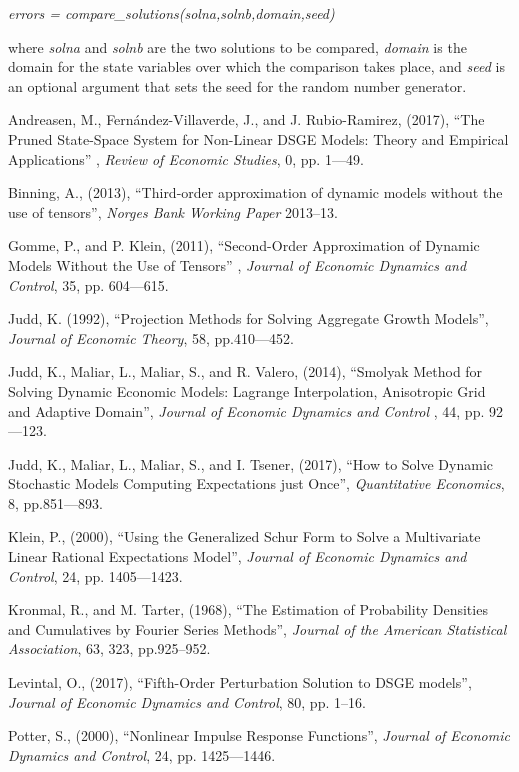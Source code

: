 \documentclass[notitlepage,11pt]{article}
\begin{document}
\bigskip 

\textit{errors = compare\_solutions(solna,solnb,domain,seed)}

\bigskip 

where \textit{solna} and \textit{solnb} are the two solutions to be
compared, \textit{domain} is the domain for the state variables over which
the comparison takes place, and \textit{seed} is an optional argument that
sets the seed for the random number generator. 

\begin{thebibliography}{99}
\bibitem{} Andreasen, M., Fern\'{a}ndez-Villaverde, J., and J.
Rubio-Ramirez, (2017), \textquotedblleft The Pruned State-Space System for
Non-Linear DSGE Models: Theory and Empirical Applications\textquotedblright
, \textit{Review of Economic Studies}, 0, pp. 1---49.

\bibitem{} Binning, A., (2013), \textquotedblleft Third-order approximation
of dynamic models without the use of tensors\textquotedblright , \textit{%
Norges Bank Working Paper} 2013--13.

\bibitem{} Gomme, P., and P. Klein, (2011), \textquotedblleft Second-Order
Approximation of Dynamic Models Without the Use of Tensors\textquotedblright
, \textit{Journal of Economic Dynamics and Control}, 35, pp. 604---615.

\bibitem{} Judd, K. (1992), \textquotedblleft Projection Methods for Solving
Aggregate Growth Models\textquotedblright , \textit{Journal of Economic
Theory}, 58, pp.410---452.

\bibitem{} Judd, K., Maliar, L., Maliar, S., and R. Valero, (2014),
\textquotedblleft Smolyak Method for Solving Dynamic Economic Models:
Lagrange Interpolation, Anisotropic Grid and Adaptive
Domain\textquotedblright , \textit{Journal of Economic Dynamics and Control}%
, 44, pp. 92---123.

\bibitem{} Judd, K., Maliar, L., Maliar, S., and I. Tsener, (2017),
\textquotedblleft How to Solve Dynamic Stochastic Models Computing
Expectations just Once\textquotedblright , \textit{Quantitative Economics},
8, pp.851---893.

\bibitem{} Klein, P., (2000), \textquotedblleft Using the Generalized Schur
Form to Solve a Multivariate Linear Rational Expectations
Model\textquotedblright , \textit{Journal of Economic Dynamics and Control},
24, pp. 1405---1423.

\bibitem{} Kronmal, R., and M. Tarter, (1968), \textquotedblleft The
Estimation of Probability Densities and Cumulatives by Fourier Series
Methods\textquotedblright , \textit{Journal of the American Statistical
Association}, 63, 323, pp.925--952.

\bibitem{} Levintal, O., (2017), \textquotedblleft Fifth-Order Perturbation
Solution to DSGE models\textquotedblright , \textit{Journal of Economic
Dynamics and Control}, 80, pp. 1--16.

\bibitem{} Potter, S., (2000), \textquotedblleft Nonlinear Impulse Response
Functions\textquotedblright , \textit{Journal of Economic Dynamics and
Control}, 24, pp. 1425---1446.
\end{thebibliography}
\end{document}
